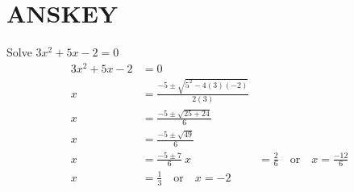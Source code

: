 \section{ANSKEY}
Solve \( 3x^2 + 5x - 2 = 0 \)
\begin{align*} 3x^2 + 5x - 2 &= 0 \\
x &= \frac{-5 \pm \sqrt{5^2 - 4(3)(-2)}}{2(3)} \\
x &= \frac{-5 \pm \sqrt{25 + 24}}{6} \\
x &= \frac{-5 \pm \sqrt{49}}{6} \\
x &= \frac{-5 \pm 7}{6} \
x &= \frac{2}{6} \quad \text{or} \quad x = \frac{-12}{6} \\
x &= \frac{1}{3} \quad \text{or} \quad x = -2 \end{align*}
